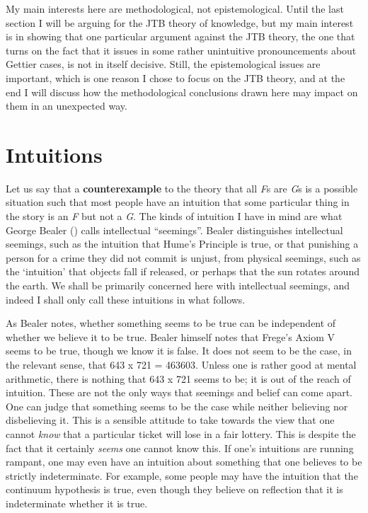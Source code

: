\documentclass[
  11pt,
  letterpaper,
  DIV=11,
  numbers=noendperiod,
  oneside]{scrartcl}
\begin{document}
My main interests here are methodological, not epistemological. Until
the last section I will be arguing for the JTB theory of knowledge, but
my main interest is in showing that one particular argument against the
JTB theory, the one that turns on the fact that it issues in some rather
unintuitive pronouncements about Gettier cases, is not in itself
decisive. Still, the epistemological issues are important, which is one
reason I chose to focus on the JTB theory, and at the end I will discuss
how the methodological conclusions drawn here may impact on them in an
unexpected way.

\section{Intuitions}\label{intuitions}

Let us say that a \textbf{counterexample} to the theory that all
\emph{F}s are \emph{G}s is a possible situation such that most people
have an intuition that some particular thing in the story is an \emph{F}
but not a \emph{G}. The kinds of intuition I have in mind are what
George Bealer () calls intellectual
``seemings''. Bealer distinguishes intellectual seemings, such as the
intuition that Hume's Principle is true, or that punishing a person for
a crime they did not commit is unjust, from physical seemings, such as
the `intuition' that objects fall if released, or perhaps that the sun
rotates around the earth. We shall be primarily concerned here with
intellectual seemings, and indeed I shall only call these intuitions in
what follows.

As Bealer notes, whether something seems to be true can be independent
of whether we believe it to be true. Bealer himself notes that Frege's
Axiom V seems to be true, though we know it is false. It does not seem
to be the case, in the relevant sense, that 643 x 721 = 463603. Unless
one is rather good at mental arithmetic, there is nothing that 643 x 721
seems to be; it is out of the reach of intuition. These are not the only
ways that seemings and belief can come apart. One can judge that
something seems to be the case while neither believing nor disbelieving
it. This is a sensible attitude to take towards the view that one cannot
\emph{know} that a particular ticket will lose in a fair lottery. This
is despite the fact that it certainly \emph{seems} one cannot know this.
If one's intuitions are running rampant, one may even have an intuition
about something that one believes to be strictly indeterminate. For
example, some people may have the intuition that the continuum
hypothesis is true, even though they believe on reflection that it is
indeterminate whether it is true.
\end{document}

